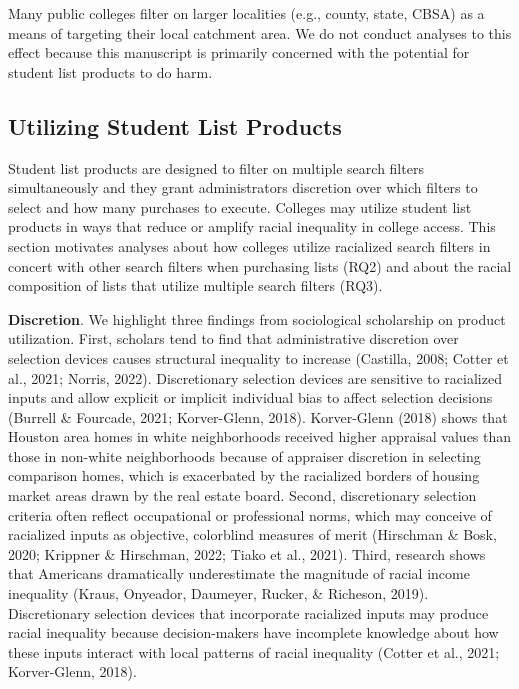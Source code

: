 \documentclass[
  12pt,
]{article}
\begin{document}
Many public colleges filter on larger localities (e.g., county, state, CBSA) as a means of targeting their local catchment area. We do not conduct analyses to this effect because this manuscript is primarily concerned with the potential for student list products to do harm.

\hypertarget{utilizing-student-list-products}{%
\subsection{Utilizing Student List Products}\label{utilizing-student-list-products}}

Student list products are designed to filter on multiple search filters simultaneously and they grant administrators discretion over which filters to select and how many purchases to execute. Colleges may utilize student list products in ways that reduce or amplify racial inequality in college access. This section motivates analyses about how colleges utilize racialized search filters in concert with other search filters when purchasing lists (RQ2) and about the racial composition of lists that utilize multiple search filters (RQ3).

\textbf{Discretion}. We highlight three findings from sociological scholarship on product utilization. First, scholars tend to find that administrative discretion over selection devices causes structural inequality to increase (Castilla, 2008; Cotter et al., 2021; Norris, 2022). Discretionary selection devices are sensitive to racialized inputs and allow explicit or implicit individual bias to affect selection decisions (Burrell \& Fourcade, 2021; Korver-Glenn, 2018). Korver-Glenn (2018) shows that Houston area homes in white neighborhoods received higher appraisal values than those in non-white neighborhoods because of appraiser discretion in selecting comparison homes, which is exacerbated by the racialized borders of housing market areas drawn by the real estate board. Second, discretionary selection criteria often reflect occupational or professional norms, which may conceive of racialized inputs as objective, colorblind measures of merit (Hirschman \& Bosk, 2020; Krippner \& Hirschman, 2022; Tiako et al., 2021). Third, research shows that Americans dramatically underestimate the magnitude of racial income inequality (Kraus, Onyeador, Daumeyer, Rucker, \& Richeson, 2019). Discretionary selection devices that incorporate racialized inputs may produce racial inequality because decision-makers have incomplete knowledge about how these inputs interact with local patterns of racial inequality (Cotter et al., 2021; Korver-Glenn, 2018).
\end{document}
